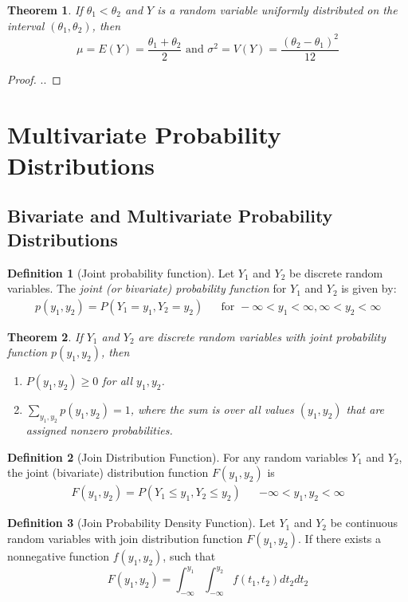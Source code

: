 \documentclass{article}
\theoremstyle{plain}
\newtheorem{thm}{Theorem}[section]
\theoremstyle{definition}
\newtheorem{defn}{Definition}[section]
\theoremstyle{remark}
\begin{document}
\begin{thm}
  If $\theta_1 < \theta_2$ and $Y$ is a random variable uniformly distributed on the interval $(\theta_1, \theta_2)$, then
$$
\mu = E(Y) = \displaystyle \frac{\theta_1 + \theta_2}{2} \text{ and } \sigma^2 = V(Y) = \displaystyle \frac{(\theta_2 - \theta_1)^2}{12}
$$
\end{thm}
\begin{proof}
..
\end{proof}


\section{Multivariate Probability Distributions}

\subsection{Bivariate and Multivariate Probability Distributions}
\begin{defn}[Joint probability function]
  Let $Y_1$ and $Y_2$ be discrete random variables. The \textit{joint (or bivariate) probability function} for $Y_1$ and $Y_2$ is given by:
\begin{align*}
p(y_1,y_2) = P(Y_1 = y_1, Y_2 = y_2) && \text{for } -\infty < y_1 < \infty, \infty < y_2 < \infty
\end{align*}
\end{defn}

\begin{thm}
  If $Y_1$ and $Y_2$ are discrete random variables with joint probability function $p(y_1, y_2)$, then
\begin{enumerate}
\item $P(y_1, y_2) \geq 0$ for all $y_1,y_2$.
\item $\sum_{y_1,y_2} p(y_1, y_2) = 1$, where the sum is over all values $(y_1, y_2)$ that are assigned nonzero probabilities.
\end{enumerate}
\end{thm}

\begin{defn}[Join Distribution Function]
  For any random variables $Y_1$ and $Y_2$, the joint (bivariate) distribution function $F(y_1, y_2)$ is
\begin{align*}
F(y_1,y_2) = P(Y_1 \leq y_1, Y_2 \leq y_2) && -\infty < y_1,y_2 < \infty
\end{align*}
\end{defn}

\begin{defn}[Join Probability Density Function]
  Let $Y_1$ and $Y_2$ be continuous random variables with join distribution function $F(y_1, y_2)$. If there exists a nonnegative function $f(y_1, y_2)$, such that
$$
F(y_1, y_2) = \displaystyle \int_{-\infty}^{y_1} \int_{-\infty}^{y_2} f(t_1, t_2) dt_2 dt_2
$$
\end{defn}
\end{document}
